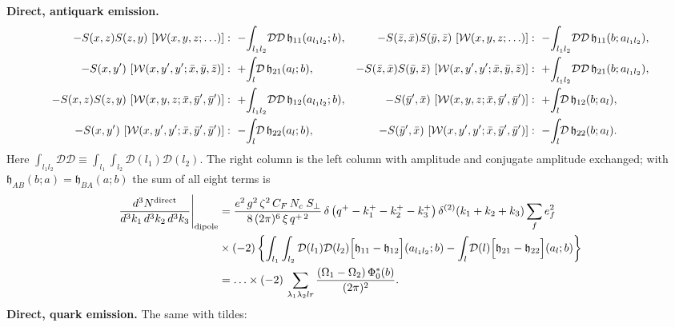 \documentclass[9pt]{article}
\numberwithin{equation}{section}
\begin{document}
\noindent\textbf{Direct, antiquark emission.}
\begin{align}
    -S(x,z)S(z,y)\ [\mathcal{W}(x,y,z;\ldots)] & :\ -\!\int_{l_{1}l_{2}}\!\mathcal{D}\mathcal{D}\,\mathfrak{h}_{11}(a_{l_{1}l_{2}};b), & -S(\Bar{z},\Bar{x})S(\Bar{y},\Bar{z})\ [\mathcal{W}(x,y,z;\ldots)] & :\ -\!\int_{l_{1}l_{2}}\!\mathcal{D}\mathcal{D}\,\mathfrak{h}_{11}(b;a_{l_{1}l_{2}}),\notag \\
    -S(x,y')\ [\mathcal{W}(x,y',y';\Bar{x},\Bar{y},\Bar{z})] & :\ +\!\int_{l}\!\mathcal{D}\,\mathfrak{h}_{21}(a_{l};b), & -S(\Bar{z},\Bar{x})S(\Bar{y},\Bar{z})\ [\mathcal{W}(x,y',y';\Bar{x},\Bar{y},\Bar{z})] & :\ +\!\int_{l_{1}l_{2}}\!\mathcal{D}\mathcal{D}\,\mathfrak{h}_{21}(b;a_{l_{1}l_{2}}),\notag \\
    -S(x,z)S(z,y)\ [\mathcal{W}(x,y,z;\Bar{x},\Bar{y}',\Bar{y}')] & :\ +\!\int_{l_{1}l_{2}}\!\mathcal{D}\mathcal{D}\,\mathfrak{h}_{12}(a_{l_{1}l_{2}};b), & -S(\Bar{y}',\Bar{x})\ [\mathcal{W}(x,y,z;\Bar{x},\Bar{y}',\Bar{y}')] & :\ +\!\int_{l}\!\mathcal{D}\,\mathfrak{h}_{12}(b;a_{l}),\notag \\
    -S(x,y')\ [\mathcal{W}(x,y',y';\Bar{x},\Bar{y}',\Bar{y}')] & :\ -\!\int_{l}\!\mathcal{D}\,\mathfrak{h}_{22}(a_{l};b), & -S(\Bar{y}',\Bar{x})\ [\mathcal{W}(x,y',y';\Bar{x},\Bar{y}',\Bar{y}')] & :\ -\!\int_{l}\!\mathcal{D}\,\mathfrak{h}_{22}(b;a_{l}).
\end{align}
Here $\int_{l_{1}l_{2}}\mathcal{D}\mathcal{D}\equiv\int_{l_{1}}\int_{l_{2}}\mathcal{D}(l_{1})\mathcal{D}(l_{2})$. The right column is the left column with amplitude and conjugate amplitude exchanged; with $\mathfrak{h}_{AB}(b;a)=\mathfrak{h}_{BA}(a;b)$ the sum of all eight terms is
\begin{align}\label{eq:resqb}
    \frac{d^{3}N^{\text{direct}}}{d^{3}k_{1}\,d^{3}k_{2}\, d^{3}k_{3}}\Bigg|_{\text{dipole}} & = \frac{e^{2}\,g^{2}\,\zeta^{2}\,C_{F}\,N_{c}\;S_{\perp}}{8\,(2\pi)^{6}\,\xi\,q^{+\,2}}\,\delta\left(q^{+}-k^{+}_{1}-k^{+}_{2}-k^{+}_{3}\right)\delta^{(2)}(k_{1}+k_{2}+k_{3})\sum_{f}e^{2}_{f}\notag \\
    & \times(-2)\left\{\int_{l_{1}}\int_{l_{2}}\mathcal{D}(l_{1})\mathcal{D}(l_{2})\Big[\mathfrak{h}_{11}-\mathfrak{h}_{12}\Big](a_{l_{1}l_{2}};b)-\int_{l}\mathcal{D}(l)\Big[\mathfrak{h}_{21}-\mathfrak{h}_{22}\Big](a_{l};b)\right\}\notag \\
    & = \ldots\times(-2)\,\sum_{\lambda_{1}\lambda_{2}lr}\frac{\left(\Omega_{1}-\Omega_{2}\right)\Phi^{*}_{0}(b)}{(2\pi)^{2}} .
\end{align}
\textbf{Direct, quark emission.} The same with tildes:
\end{document}
